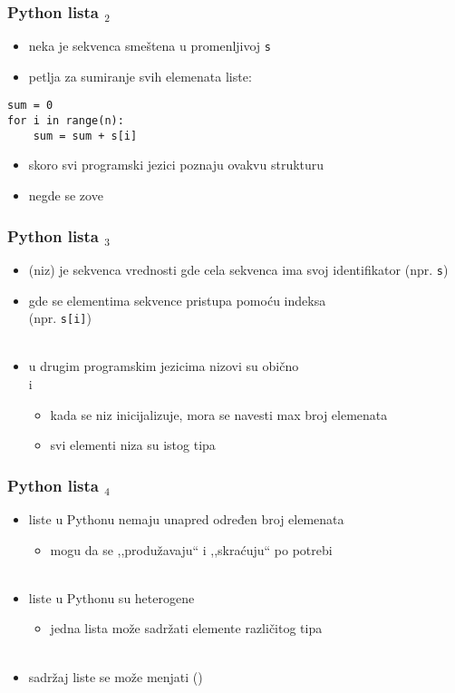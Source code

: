 \documentclass[utf8,compress,aspectratio=169]{beamer}
\begin{document}
\begin{frame}[fragile]
  \frametitle{Python lista $_2$}
  \begin{itemize}
    \item neka je sekvenca smeštena u promenljivoj \texttt{s}
    \item petlja za sumiranje svih elemenata liste:
  \end{itemize}
\begin{verbatim}
sum = 0
for i in range(n):
    sum = sum + s[i]
\end{verbatim}
  \begin{itemize}
    \item skoro svi programski jezici poznaju ovakvu strukturu
    \item negde se zove 
  \end{itemize}
\end{frame}

\begin{frame}[fragile]
  \frametitle{Python lista $_3$}
  \begin{itemize}
    \item {} (niz) je sekvenca vrednosti gde cela sekvenca ima svoj identifikator (npr. \texttt{s})
    \item gde se elementima sekvence pristupa pomoću indeksa \\(npr. \texttt{s[i]}) \\ \ \\
    \item u drugim programskim jezicima nizovi su obično  \\i {}
    \begin{itemize}
      \item kada se niz inicijalizuje, mora se navesti max broj elemenata
      \item svi elementi niza su istog tipa
    \end{itemize}
  \end{itemize}
\end{frame}

\begin{frame}[fragile]
  \frametitle{Python lista $_4$}
  \begin{itemize}
    \item liste u Pythonu nemaju unapred određen broj elemenata
    \begin{itemize}
      \item mogu da se ,,produžavaju`` i ,,skraćuju`` po potrebi \\ \ \\
    \end{itemize}
    \item liste u Pythonu su heterogene
    \begin{itemize}
      \item jedna lista može sadržati elemente različitog tipa \\ \ \\
    \end{itemize}
    \item sadržaj liste se može menjati ()
  \end{itemize}
\end{frame}
\end{document}
